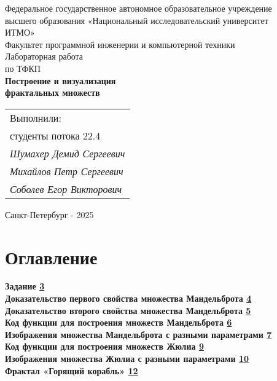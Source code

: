 \documentclass[a4paper,12pt]{article}
\begin{document}
\begin{titlepage}
    \centering
    \normalsize
    Федеральное государственное автономное образовательное учреждение \\
    высшего образования «Национальный исследовательский университет \\
    ИТМО» \\[0.8cm]
    Факультет программной инженерии и компьютерной техники \\[2.5cm]
    
    \LARGE
    Лабораторная работа \\
    \normalsize
    по ТФКП \\[1.2cm]
    
    \Large
    \textbf{Построение и визуализация \\ фрактальных множеств}
    
    \vfill
    
    \hfill
    \begin{tabular}{l}
        Выполнили: \\
        студенты потока 22.4 \\[0.3cm]
        \textit{Шумахер Демид Сергеевич} \\
        \textit{Михайлов Петр Сергеевич} \\
        \textit{Соболев Егор Викторович} \\
    \end{tabular}
    \hspace{1cm}
    
    \vfill
    
    \centering
    Санкт-Петербург - 2025
\end{titlepage}

\pagestyle{plain}
\setcounter{page}{2}

\section*{\textbf{Оглавление}}

{\bfseries
{} \quad Задание \hfill \hyperlink{sec:1}{3} \\
 \quad Доказательство первого свойства множества Мандельброта \hfill \hyperlink{sec:2}{4} \\
 \quad Доказательство второго свойства множества Мандельброта \hfill \hyperlink{sec:3}{5} \\
 \quad Код функции для построения множеств Мандельброта \hfill \hyperlink{sec:4}{6} \\
 \quad Изображения множества Мандельброта с разными параметрами \hfill \hyperlink{sec:5}{7} \\
 \quad Код функции для построения множеств Жюлиа \hfill \hyperlink{sec:6}{9} \\
 \quad Изображения множества Жюлиа с разными параметрами \hfill \hyperlink{sec:7}{10} \\
 \quad Фрактал «Горящий корабль» \hfill \hyperlink{sec:8}{12} \\
}
\end{document}
